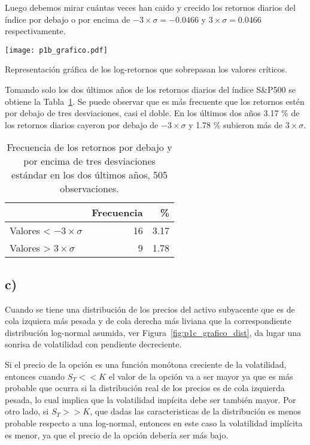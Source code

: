 \documentclass{tufte-handout}
\begin{document}
Luego debemos mirar cuántas veces han caido y crecido los retornos diarios del índice por debajo o por encima de $- 3\times\sigma = -0.0466$ y $3\times\sigma = 0.0466$ respectivamente.

\begin{marginfigure}[-3cm]
\centering
\texttt{[image: p1b\_grafico.pdf]}
\caption{Representación gráfica de los log-retornos que sobrepasan los valores críticos.}
\end{marginfigure}

Tomando solo los dos últimos años de los retornos diarios del índice S\&P500 se obtiene la Tabla~\ref{tab:p1b_frecuencias}. Se puede observar que es más frecuente que los retornos estén por debajo de tres desviaciones, casi el doble. En los últimos dos años 3.17 \% de los retornos diarios cayeron por debajo de $- 3\times\sigma$ y 1.78 \% subieron más de $3\times\sigma$.

\begin{table}
\caption{Frecuencia de los retornos por debajo y por encima de tres desviaciones estándar en los dos últimos años, 505 observaciones.}
\label{tab:p1b_frecuencias}
\centering
\begin{tabular}{lrr}
& Frecuencia & \% \\
\hline
Valores < $- 3\times\sigma$ & 16 & 3.17 \\
Valores > $3\times\sigma$ & 9 & 1.78 \\
\hline
\end{tabular}
\end{table}
 

\subsection*{c)}

Cuando se tiene una distribución de los precios del activo subyacente que es de cola izquiera más pesada y de cola derecha más liviana que la correspondiente distribución log-normal asumida, ver Figura~\ref{fig:p1c_grafico_dist}, da lugar una sonrisa de volatilidad con pendiente decreciente.

Si el precio de la opción es una función monótona creciente de la volatilidad, entonces cuando $S_T << K$ el valor de la opción va a ser mayor ya que es más probable que ocurra si la distribución real de los precios es de cola izquierda pesada, lo cual implica que la volatilidad impícita debe ser también mayor. Por otro lado, si $S_T >> K$, que dadas las caracteristicas de la distribución es menos probable respecto a una log-normal, entonces en este caso la volatilidad implícita es menor, ya que el precio de la opción debería ser más bajo.
\end{document}
